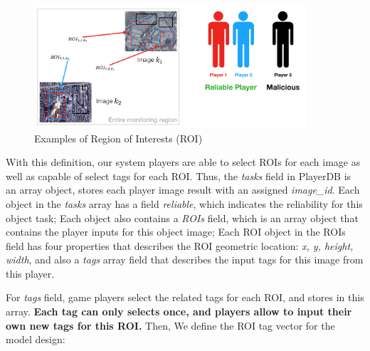 \begin{figure}[htp]
\centering
\includegraphics[width=0.9\textwidth]{figures/roi}
\caption{Examples of Region of Interests (ROI)}
\label{fig:roi}
\end{figure}

With this definition, our system players are able to select ROIs for each image as well as capable of select tags for each ROI.
Thus, the \emph{tasks} field in PlayerDB is an array object, stores each player image result with an assigned \emph{image\_id}.
Each object in the \emph{tasks} array has a field \emph{reliable}, which indicates the reliability for this object task;
Each object also contains a \emph{ROIs} field, which is an array object that contains the player inputs for this object image;
Each ROI object in the ROIs field has four properties that describes the ROI geometric location: \emph{x, y, height, width}, and 
also a \emph{tags} array field that describes the input tags for this image from this player.

For \emph{tags} field,
game players select the related tags for each ROI, and stores in this array. \textbf{Each tag can only selects once, 
and players allow to input their own new tags for this ROI.} Then, We define the ROI tag vector for the model design:


